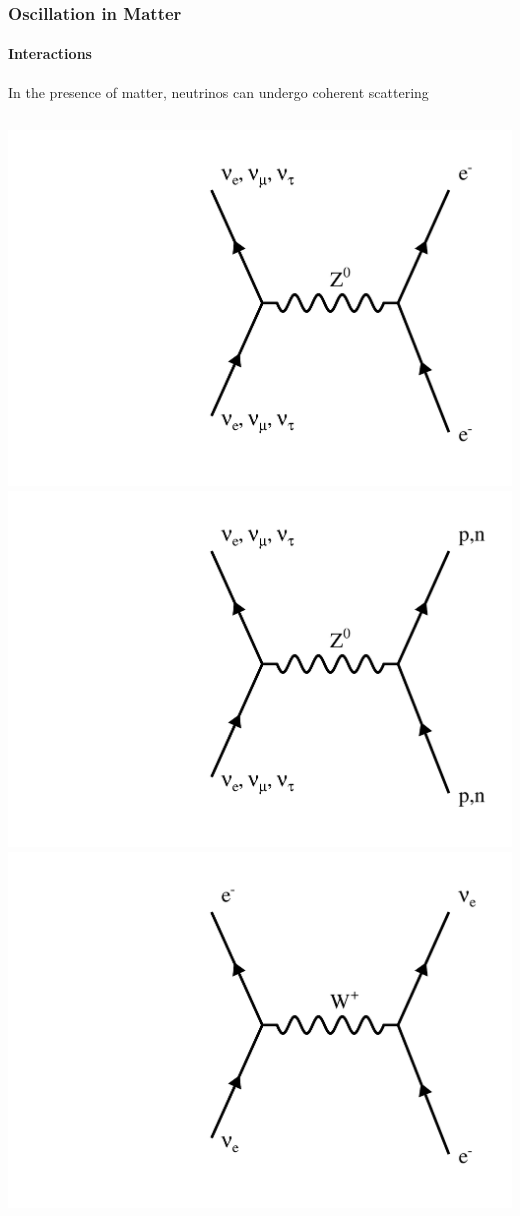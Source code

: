 \documentclass[10pt,professionalfonts,xcolor=table]{beamer}
\begin{document}
\frame
{
  \frametitle{Oscillation in Matter}
  \framesubtitle{Interactions}
  \begin{itemize}
  \bang In the presence of matter, neutrinos can undergo coherent scattering
  \begin{columns}[c]
    \centering
    \includegraphics[width=\textwidth, angle=-90]{figures/feynman/ncElec.pdf}
      \centering
      \includegraphics[width=\textwidth, angle=-90]{figures/feynman/ncHad.pdf}
      \centering
      \includegraphics[width=\textwidth, angle=-90]{figures/feynman/ccElec.pdf}


\end{columns}
\end{itemize}}
\end{document}
